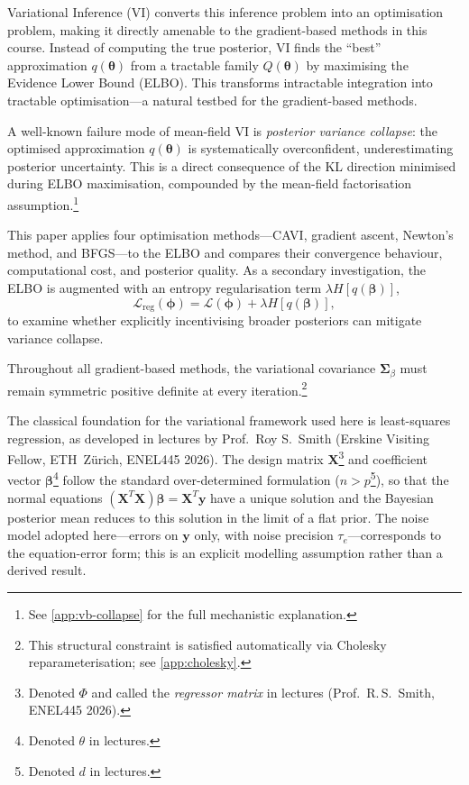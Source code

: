 \documentclass[11pt,a4paper]{article}
\begin{document}
Variational Inference (VI) converts this inference problem into an optimisation problem, making it directly amenable to the gradient-based methods in this course.
Instead of computing the true posterior, VI finds the ``best'' approximation $q(\bm{\theta})$ from a tractable family $Q(\bm{\theta})$
by maximising the Evidence Lower Bound (ELBO). 
This transforms intractable integration into tractable optimisation---a natural testbed for the gradient-based methods.

A well-known failure mode of mean-field VI is \emph{posterior variance collapse}:
the optimised approximation $q(\bm{\theta})$ is systematically overconfident,
underestimating posterior uncertainty. This is a direct consequence of the KL direction minimised during ELBO maximisation,
compounded by the mean-field factorisation assumption.\footnote{See \ref{app:vb-collapse} for the full mechanistic explanation.}

This paper applies four optimisation methods---CAVI, gradient ascent, Newton's method, and BFGS---to the ELBO and compares their convergence behaviour, computational cost, and posterior quality.
As a secondary investigation, the ELBO is augmented with an entropy regularisation term $\lambda H[q(\bm{\beta})]$,
\begin{equation*}
    \mathcal{L}_{\mathrm{reg}}(\bm{\phi}) = \mathcal{L}(\bm{\phi}) + \lambda H[q(\bm{\beta})],
\end{equation*}
to examine whether explicitly incentivising broader posteriors can mitigate variance collapse.

Throughout all gradient-based methods, the variational covariance $\bm{\Sigma}_\beta$ must remain symmetric positive definite at every iteration.\footnote{This structural constraint is satisfied automatically via Cholesky reparameterisation; see \ref{app:cholesky}.}

The classical foundation for the variational framework used here is least-squares regression,
as developed in lectures by Prof.\ Roy S.\ Smith (Erskine Visiting Fellow, ETH~Z\"{u}rich,
ENEL445 2026). The design matrix $\bm{X}$\footnote{Denoted $\Phi$ and called the
\emph{regressor matrix} in lectures (Prof.\ R.\,S.\ Smith, ENEL445 2026).} and coefficient
vector $\bm{\beta}$\footnote{Denoted $\theta$ in lectures.} follow the standard
over-determined formulation ($n > p$\footnote{Denoted $d$ in lectures.}), so that the normal
equations $(\bm{X}^T\bm{X})\bm{\beta} = \bm{X}^T\bm{y}$ have a unique solution and the
Bayesian posterior mean reduces to this solution in the limit of a flat prior. The noise model
adopted here---errors on $\bm{y}$ only, with noise precision $\tau_e$---corresponds to the
equation-error form; this is an explicit modelling assumption rather than a derived result.
\end{document}
